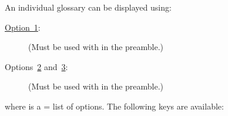 \documentclass[report,inlinetitle]{nlctdoc}
\newcommand*{\opt}[1]{\hyperlink{option#1}{Option~#1}}
\newcommand*{\optsand}[2]{Options~\hyperlink{option#1}{#1}
and~\hyperlink{option#2}{#2}}
\begin{document}
An individual glossary can be displayed using:
\begin{description}
\item[\opt1:]\null
\begin{definition}[\DescribeMacro{\printnoidxglossary}]
\end{definition}
(Must be used with  in the preamble.)

\item[\optsand23:]\null
\begin{definition}[\DescribeMacro{\printglossary}]
\end{definition}
(Must be used with  in the preamble.)
\end{description}
where  is a = list of options. 
The following keys are available:
\end{document}
